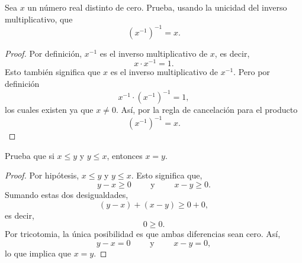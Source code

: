 \documentclass[12pt,a4paper]{article}
\begin{document}
    \begin{problema}
        Sea $x$ un número real distinto de cero. Prueba, usando la unicidad del inverso multiplicativo, que
        \begin{equation*}
            (x^{-1})^{-1}=x.
        \end{equation*}
    \end{problema}

    \begin{proof}
        Por definición, $x^{-1}$ es el inverso multiplicativo de $x$, es decir,
        \begin{equation*}
            x\cdot x^{-1}=1.
        \end{equation*}
        Esto también significa que $x$ es el inverso multiplicativo de $x^{-1}$. Pero por definición
        \begin{equation*}
            x^{-1}\cdot(x^{-1})^{-1}=1,
        \end{equation*}
        los cuales existen ya que $x\neq0$. Así, por la regla de cancelación para el producto
        \begin{equation*}
            (x^{-1})^{-1}=x.
        \end{equation*}
    \end{proof}

    \begin{problema}
        Prueba que si $x\leq y$ y $y\leq x$, entonces $x=y$.
    \end{problema}

    \begin{proof}
        Por hipótesis, $x\leq y$ y $y\leq x$. Esto significa que,
        \begin{equation*}
            y-x\geq0\qquad\text{ y }\qquad x-y\geq0.
        \end{equation*}
        Sumando estas dos desigualdades,
        \begin{equation*}
            (y-x)+(x-y)\geq0+0,
        \end{equation*}
        es decir,
        \begin{equation*}
            0\geq0.
        \end{equation*}
        Por tricotomia, la única posibilidad es que ambas diferencias sean cero. Así,
        \begin{equation*}
            y-x=0\qquad\text{ y }\qquad x-y=0,
        \end{equation*}
        lo que implica que $x=y$.
    \end{proof}
\end{document}
